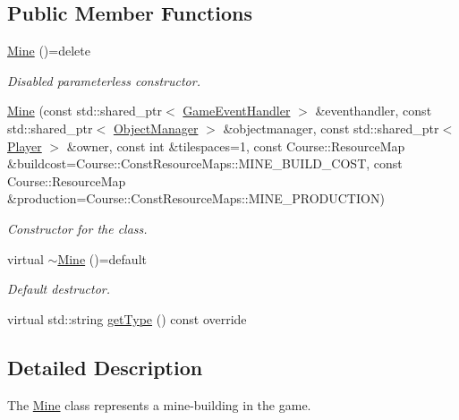 \subsection*{Public Member Functions}
\begin{DoxyCompactItemize}
\item 
\hypertarget{classMine_a4c43d4530ffb0859f76c8dc88f23fe32}{\hyperlink{classMine_a4c43d4530ffb0859f76c8dc88f23fe32}{Mine} ()=delete}\label{classMine_a4c43d4530ffb0859f76c8dc88f23fe32}

\begin{DoxyCompactList}\small\item\em Disabled parameterless constructor. \end{DoxyCompactList}\item 
\hyperlink{classMine_a7fcd00f345c281632eb4e8fd684c99fb}{Mine} (const std\-::shared\-\_\-ptr$<$ \hyperlink{classGameEventHandler}{Game\-Event\-Handler} $>$ \&eventhandler, const std\-::shared\-\_\-ptr$<$ \hyperlink{classObjectManager}{Object\-Manager} $>$ \&objectmanager, const std\-::shared\-\_\-ptr$<$ \hyperlink{classPlayer}{Player} $>$ \&owner, const int \&tilespaces=1, const Course\-::\-Resource\-Map \&buildcost=Course\-::\-Const\-Resource\-Maps\-::\-M\-I\-N\-E\-\_\-\-B\-U\-I\-L\-D\-\_\-\-C\-O\-S\-T, const Course\-::\-Resource\-Map \&production=Course\-::\-Const\-Resource\-Maps\-::\-M\-I\-N\-E\-\_\-\-P\-R\-O\-D\-U\-C\-T\-I\-O\-N)
\begin{DoxyCompactList}\small\item\em Constructor for the class. \end{DoxyCompactList}\item 
\hypertarget{classMine_afc625411283c4d05ec2036835311c74d}{virtual \hyperlink{classMine_afc625411283c4d05ec2036835311c74d}{$\sim$\-Mine} ()=default}\label{classMine_afc625411283c4d05ec2036835311c74d}

\begin{DoxyCompactList}\small\item\em Default destructor. \end{DoxyCompactList}\item 
virtual std\-::string \hyperlink{classMine_a00834ef329590343a322e934c531095f}{get\-Type} () const override
\end{DoxyCompactItemize}


\subsection{Detailed Description}
The \hyperlink{classMine}{Mine} class represents a mine-\/building in the game. 

